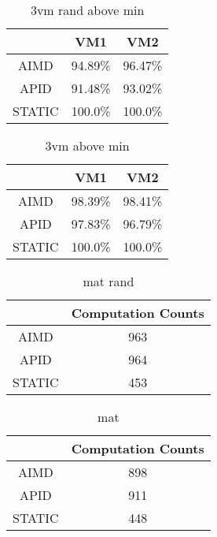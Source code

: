 \begin{table}[]
\centering
\caption{3vm rand above min}
\label{my-label}
\begin{tabular}{|c|c|c|}
\hline
 & VM1 & VM2 \\ \hline
AIMD& 94.89\% & 96.47\%  \\ \hline
APID& 91.48\% & 93.02\%  \\ \hline
STATIC& 100.0\% & 100.0\%  \\ \hline

\end{tabular}
\end{table}


\begin{table}[]
\centering
\caption{3vm above min}
\label{my-label}
\begin{tabular}{|c|c|c|}
\hline
 & VM1 & VM2 \\ \hline
AIMD& 98.39\% & 98.41\%  \\ \hline
APID& 97.83\% & 96.79\%  \\ \hline
STATIC& 100.0\% & 100.0\%  \\ \hline

\end{tabular}
\end{table}



\begin{table}[]
\centering
\caption{mat rand}
\label{my-label}
\begin{tabular}{|c|c|}
\hline
\multicolumn{1}{|l|}{} & \multicolumn{1}{l|}{Computation Counts} \\ \hline
AIMD & 963 \\ \hline
APID & 964 \\ \hline
STATIC & 453 \\ \hline

\end{tabular}
\end{table}

\begin{table}[]
\centering
\caption{mat}
\label{my-label}
\begin{tabular}{|c|c|}
\hline
\multicolumn{1}{|l|}{} & \multicolumn{1}{l|}{Computation Counts} \\ \hline
AIMD & 898 \\ \hline
APID & 911 \\ \hline
STATIC & 448 \\ \hline

\end{tabular}
\end{table}



